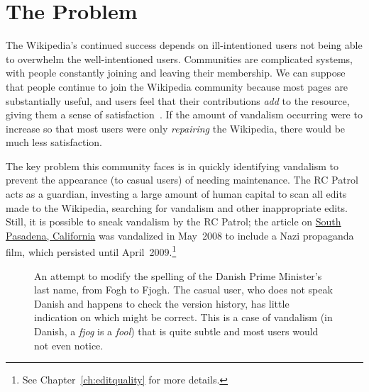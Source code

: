 \section{The Problem}

The Wikipedia's continued success depends on ill-intentioned users
not being able to overwhelm the well-intentioned users.
Communities are complicated systems, with people constantly joining and
leaving their membership.
We can suppose that people continue to
join the Wikipedia community because most pages are
substantially useful, and users feel that their contributions
\textit{add} to the resource,
giving them a sense of satisfaction~\cite{Benkler2002}.
If the amount of vandalism occurring were to increase so that
most users were only \textit{repairing} the Wikipedia, there
would be much less satisfaction.

The key problem this community faces is in quickly identifying vandalism
to prevent the appearance (to casual users)
of needing maintenance.
The RC Patrol~\cite{wiki:RCPatrol} acts as a guardian,
investing a large amount of human capital to scan all
edits made to the Wikipedia, searching for vandalism and
other inappropriate edits.
Still, it is possible to sneak vandalism by the
RC Patrol; the article on \underline{South Pasadena, California}
was vandalized in May~2008 to include a Nazi propaganda film,
which persisted until April~2009.\footnote{See Chapter~\ref{ch:editquality}
for more details.}

\begin{figure}[t]
\centering
{}
\hspace{1ex}
\caption[An example of vandalism which is not obvious to the casual reader]{
  An attempt to modify the
  spelling of the Danish Prime Minister's last name, from Fogh to Fjogh.
  The casual user, who does not speak Danish and happens to check
  the version history, has little indication on which might be correct.
  This is a case of vandalism
  (in Danish, a \textit{fjog} is a \textit{fool})
  that is quite subtle and most users would not even notice.}
\label{fig-denmark}
\end{figure}


